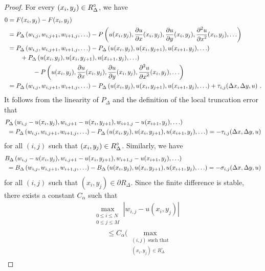 \begin{proof}
For every $\displaystyle (x_i,y_j) \in R^\circ_\Delta$, we have
\begin{align*}
0 &= F(x_i,y_j) - F(x_i,y_j) \\
&= P_\Delta\left(w_{i,j}, w_{i,j+1}, w_{i+1,j}, \ldots\right) - 
P\left(u(x_i,y_j), \frac{\partial{u}}{\partial{x}}(x_i,y_j), \frac{\partial{u}}{\partial{y}}(x_i,y_j),
\frac{\displaystyle \partial^{2}{u}} {\displaystyle \partial{x}^{2}}(x_i,y_j), \ldots \right) \\
&= P_\Delta\left(w_{i,j}, w_{i,j+1}, w_{i+1,j}, \ldots\right) - 
P_\Delta\left(u(x_i,y_j), u(x_i,y_{j+1}), u(x_{i+1},y_j),\ldots \right) \\
&\qquad + P_\Delta\left(u(x_i,y_j), u(x_i,y_{j+1}),
  u(x_{i+1},y_j), \ldots \right) \\
&\qquad \qquad -
P\left(u(x_i,y_j), \frac{\partial{u}}{\partial{x}}(x_i,y_j), \frac{\partial{u}}{\partial{y}}(x_i,y_j),
\frac{\displaystyle \partial^{2}{u}} {\displaystyle \partial{x}^{2}}(x_i,y_j), \ldots \right) \\
&= P_\Delta\left(w_{i,j}, w_{i,j+1}, w_{i+1,j}, \ldots\right) - 
P_\Delta\left(u(x_i,y_j), u(x_i,y_{j+1}), u(x_{i+1},y_j),\ldots \right)
+ \tau_{i,j}(\Delta{x},\Delta{y},u) \ .
\end{align*}
It follows from the linearity of $P_\Delta$ and the definition of the
local truncation error that
\begin{align*}
&P_\Delta\left(w_{i,j}-u(x_i,y_j), w_{i,j+1}-u(x_i,y_{j+1}),
w_{i+1,j}-u(x_{i+1},y_j), \ldots\right) \\
&\ = P_\Delta\left(w_{i,j}, w_{i,j+1}, w_{i+1,j}, \ldots\right) - 
P_\Delta\left(u(x_i,y_j), u(x_i,y_{j+1}), u(x_{i+1},y_j),
  \ldots \right)  = - \tau_{i,j}(\Delta{x},\Delta{y},u)
\end{align*}
for all $(i,j)$ such that $\displaystyle (x_i,y_j) \in R^\circ_\Delta$.
Similarly, we have
\begin{align*}
&B_\Delta\left(w_{i,j}-u(x_i,y_j), w_{i,j+1}-u(x_i,y_{j+1}),
w_{i+1,j}-u(x_{i+1},y_j), \ldots\right) \\
&\ = B_\Delta\left(w_{i,j}, w_{i,j+1}, w_{i+1,j}, \ldots\right) - 
B_\Delta\left(u(x_i,y_j), u(x_i,y_{j+1}), u(x_{i+1},y_j),
  \ldots \right)  = - \sigma_{i,j}(\Delta{x},\Delta{y},u)
\end{align*}
for all $(i,j)$ such that $(x_i,y_j) \in \partial R_\Delta$.  Since
the finite difference is stable, there exists a constant $C_\alpha$ such that
\begin{align*}
&\max_{\substack{0\leq i\leq N\\0\leq j \leq M}} |w_{i,j} - u(x_i,y_j)| \\
&\qquad \leq C_\alpha \bigg(
\max_{\substack{(i,j) \text{ such that}\\(x_i,y_j)\in R^\circ_\Delta}}

\end{align*}
\end{proof}
